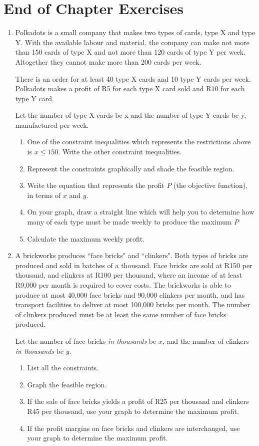 \section{End of Chapter Exercises}
\begin{enumerate}

\item{Polkadots is a small company that makes two types of cards, type X and type Y. With the available labour and material, the company can make not more than 150 cards of type X and not more than 120 cards of type Y per week. Altogether they cannot make more than 200 cards per week.

There is an order for at least 40 type X cards and 10 type Y cards per week.
Polkadots makes a profit of R5 for each type X card sold and R10 for each type Y card.

Let the number of type X cards be x and the number of type Y cards be y, manufactured per week.

\begin{enumerate}
\item{One of the constraint inequalities which represents the restrictions above is $x\leq 150$. Write the other constraint inequalities.}
\item{Represent the constraints graphically and shade the feasible region.}
\item{Write the equation that represents the profit $P$ (the objective function), in terms of $x$ and $y$.}
\item{On your graph, draw a straight line which will help you to determine how many of each type must be made weekly to produce the maximum $P$}
\item{Calculate the maximum weekly profit.}
\end{enumerate}}

\item{A brickworks produces ``face bricks" and ``clinkers". Both types of bricks are produced and sold in batches of a thousand. Face bricks are sold at R150 per thousand, and clinkers at R100 per thousand, where an income of at least R9,000 per month is required to cover costs. The brickworks is able to produce at most 40,000 face bricks and 90,000 clinkers per month, and has transport facilities to deliver at most 100,000 bricks per month. The number of clinkers produced must be at least the same number of face bricks produced.

Let the number of face bricks \textit{in thousands} be $x$, and the number of clinkers \textit{in thousands} be $y$.
\begin{enumerate}
\item{List all the constraints.}
\item{Graph the feasible region.}
\item{If the sale of face bricks yields a profit of R25 per thousand and clinkers R45 per thousand, use your graph to determine the maximum profit.}
\item{If the profit margins on face bricks and clinkers are interchanged, use your graph to determine the maximum profit.}
\end{enumerate}}


\end{enumerate}

